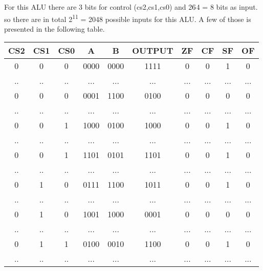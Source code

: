 \documentclass[12pt]{article}
\begin{document}
For this ALU there are 3 bits for control (cs2,cs1,cs0) and 2$\ding{54}$4 = 8 bits as input. so there are in total 2\textsuperscript{11} = 2048 possible inputs for this ALU. A few  of those is presented in the following table.


\begin{table}[H]

    \centering
    \begin{adjustbox}{width = \textwidth}
    
    \begin{tabular}{|c c c|c|c|c|c|c|c|c|}
    \hline
    CS2 & CS1 & CS0 & A & B & OUTPUT & ZF & CF & SF & OF\\

    \hline

    0 & 0 & 0 & 0000 & 0000 & 1111 & 0 & 0 & 1 & 0\\

    .. & .. & .. & ...  & ...& ...& ...& ...& ...& ...\\

    0 & 0 & 0 & 0001 & 1100 & 0100 & 0& 0& 0& 0\\

    .. & .. & .. & ...  & ...& ...& ...& ...& ...& ...\\

    0 & 0 & 1 & 1000& 0100& 1000& 0& 0& 1& 0\\

    .. & .. & .. & ...  & ...& ...& ...& ...& ...& ...\\

    0 & 0 & 1 & 1101& 0101& 1101& 0& 0 & 1& 0\\

    .. & .. & .. & ...  & ...& ...& ...& ...& ...& ...\\

    0 & 1 & 0 & 0111& 1100& 1011& 0& 0& 1& 0 \\

    .. & .. & .. & ...  & ...& ...& ...& ...& ...& ...\\

    0 & 1 & 0 & 1001& 1000& 0001& 0& 0& 0& 0\\

    .. & .. & .. & ...  & ...& ...& ...& ...& ...& ...\\

    0 & 1 & 1 & 0100& 0010& 1100& 0& 0& 1& 0\\

    .. & .. & .. & ...  & ...& ...& ...& ...& ...& ...\\


\end{tabular}
\end{adjustbox}
\end{table}
\end{document}
